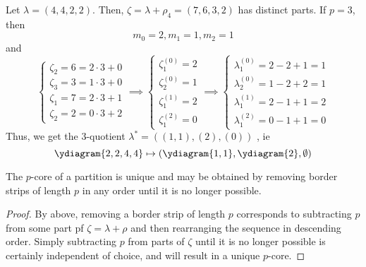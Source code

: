 \documentclass[11pt,leqno,oneside]{amsart}
\numberwithin{thm}{section}
\begin{document}
\begin{example}
  Let \(\lambda=(4,4,2,2)\). Then, \(\zeta = \lambda+\rho_4 =
  (7,6,3,2)\) has distinct parts. If \(p=3\), then \[
    m_0 = 2, m_1 = 1, m_2 = 1
  \]
  and \[
    \begin{cases}
      \zeta_2 = 6 = 2 \cdot 3 + 0\\
      \zeta_3 = 3 = 1 \cdot 3 + 0\\
      \zeta_1 = 7 = 2 \cdot 3 + 1 \\
      \zeta_2 = 2 = 0 \cdot 3 + 2
    \end{cases} \implies
    \begin{cases}
      \zeta^{(0)}_1 = 2\\
      \zeta^{(0)}_2 = 1\\
      \zeta^{(1)}_1 = 2\\
      \zeta^{(2)}_1 = 0
    \end{cases}
    \implies
    \begin{cases}
      \lambda_1^{(0)} = 2-2+1 = 1\\
      \lambda_2^{(0)} = 1-2+2 = 1\\
      \lambda_1^{(1)} = 2-1+1 = 2\\
      \lambda_1^{(2)} = 0-1+1 = 0
    \end{cases}
  \]
  Thus, we get the \(3\)-quotient \(\lambda^* = ((1,1),(2),(0))\)   
,
  ie \[
    \ydiagram{2,2,4,4} \mapsto \left( \ydiagram{1,1},\ydiagram{2},
      \emptyset \right)
  \]
\end{example}
\begin{prop}
  The \(p\)-core of a partition is unique and may be obtained by
  removing border strips of length \(p\) in any order until it is no longer
  possible. 
\end{prop}
\begin{proof}
  By above, removing a border strip of length \(p\) corresponds to
  subtracting \(p\) from some part pf \(\zeta = \lambda+\rho\) and
  then rearranging the sequence in descending order. Simply
  subtracting \(p\) from parts of \(\zeta\) until it is no longer
  possible is certainly independent of choice, and will result in a
  unique \(p\)-core.
\end{proof}
\end{document}
